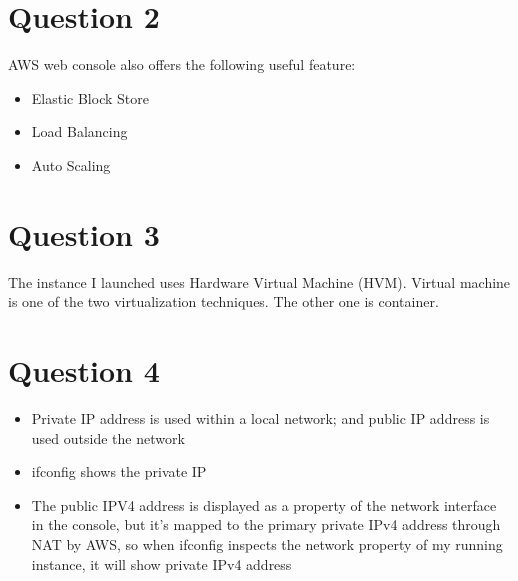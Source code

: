 \documentclass{article}
\begin{document}
\section{Question 2}
AWS web console also offers the following useful feature:
\begin{itemize}
    \item Elastic Block Store
    \item Load Balancing
    \item Auto Scaling
\end{itemize}

\section{Question 3}
The instance I launched uses Hardware Virtual Machine (HVM). Virtual machine is one of the two virtualization techniques. The other one is container.

\section{Question 4}
\begin{itemize}
    \item Private IP address is used within a local network; and public IP address is used outside the network
    \item ifconfig shows the private IP
    \item The public IPV4 address is displayed as a property of the network interface in the console, but it's mapped to the primary private IPv4 address through NAT by AWS, so when ifconfig inspects the network property of my running instance, it will show private IPv4 address
\end{itemize}
\end{document}
